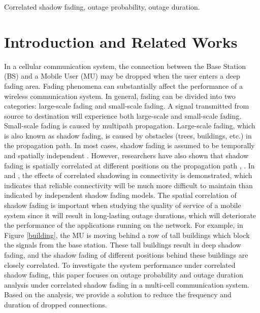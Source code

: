 \documentclass[journal,comsoc]{IEEEtran}
\begin{document}
\begin{IEEEkeywords}
Correlated shadow fading, outage probability, outage duration.
\end{IEEEkeywords}


\section{Introduction and Related Works}

\par In a cellular communication system, the connection between the Base Station (BS) and a Mobile User (MU) may be dropped when the user enters a deep fading area. Fading phenomena can substantially affect the performance of a wireless communication system. In general, fading can be divided into two categories: large-scale fading and small-scale fading. A signal transmitted from source to destination will experience both large-scale and small-scale fading. Small-scale fading is caused by multipath propagation. Large-scale fading, which is also known as shadow fading, is caused by obstacles (trees, buildings, etc.) in the propagation path. In most cases, shadow fading is assumed to be temporally and spatially independent \cite{rappaport1996wireless}.  However, researchers have also shown that shadow fading is spatially correlated at different positions on the propagation path \cite{gudmundson1991correlation}, \cite{zhang2008novel}. In \cite{fabbri2009impact} and \cite{patwari2008effects}, the effects of correlated shadowing in connectivity is demonstrated, which indicates that reliable connectivity will be much more difficult to maintain than indicated by independent shadow fading models. The spatial correlation of shadow fading is important when studying the quality of service of a mobile system since it will result in long-lasting outage durations, which will deteriorate the performance of the applications running on the network. For example, in Figure \ref{building}, the MU is moving behind a row of tall buildings which block the signals from the base station. These tall buildings result in deep shadow fading, and the shadow fading of different positions behind these buildings are closely correlated. To investigate the system performance under correlated shadow fading, this paper focuses on outage probability and outage duration analysis under correlated shadow fading in a multi-cell communication system. Based on the analysis, we provide a solution to reduce the frequency and duration of dropped connections.
\end{document}
